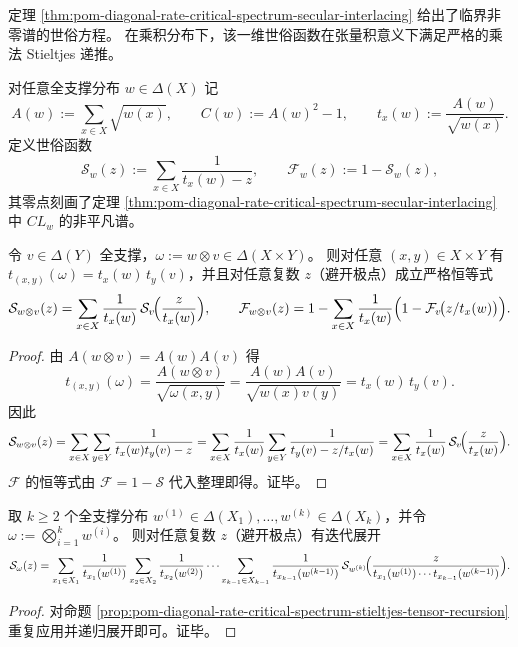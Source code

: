 定理 \ref{thm:pom-diagonal-rate-critical-spectrum-secular-interlacing} 给出了临界非零谱的世俗方程。
在乘积分布下，该一维世俗函数在张量积意义下满足严格的乘法 Stieltjes 递推。

\begin{proposition}\label{prop:pom-diagonal-rate-critical-spectrum-stieltjes-tensor-recursion}
对任意全支撑分布 \(w\in\Delta(X)\) 记
\[
A(w):=\sum_{x\in X}\sqrt{w(x)},\qquad
C(w):=A(w)^2-1,
\qquad
t_x(w):=\frac{A(w)}{\sqrt{w(x)}}.
\]
定义世俗函数
\[
\mathcal S_w(z):=\sum_{x\in X}\frac{1}{t_x(w)-z},
\qquad
\mathcal F_w(z):=1-\mathcal S_w(z),
\]
其零点刻画了定理 \ref{thm:pom-diagonal-rate-critical-spectrum-secular-interlacing} 中 \(CL_w\) 的非平凡谱。
\par
令 \(v\in\Delta(Y)\) 全支撑，\(\omega:=w\otimes v\in\Delta(X\times Y)\)。
则对任意 \((x,y)\in X\times Y\) 有
\(
t_{(x,y)}(\omega)=t_x(w)\,t_y(v)
\)，并且对任意复数 \(z\)（避开极点）成立严格恒等式
\[
\mathcal S_{w\otimes v}(z)
=\sum_{x\in X}\frac{1}{t_x(w)}\,\mathcal S_v\!\Bigl(\frac{z}{t_x(w)}\Bigr),
\qquad
\mathcal F_{w\otimes v}(z)
=1-\sum_{x\in X}\frac{1}{t_x(w)}\Bigl(1-\mathcal F_v\!\bigl(z/t_x(w)\bigr)\Bigr).
\]
\end{proposition}
\begin{proof}
由 \(A(w\otimes v)=A(w)A(v)\) 得
\[
t_{(x,y)}(\omega)
=\frac{A(w\otimes v)}{\sqrt{\omega(x,y)}}
=\frac{A(w)A(v)}{\sqrt{w(x)v(y)}}
=t_x(w)\,t_y(v).
\]
因此
\[
\mathcal S_{w\otimes v}(z)
=\sum_{x\in X}\sum_{y\in Y}\frac{1}{t_x(w)t_y(v)-z}
=\sum_{x\in X}\frac{1}{t_x(w)}\sum_{y\in Y}\frac{1}{t_y(v)-z/t_x(w)}
=\sum_{x\in X}\frac{1}{t_x(w)}\,\mathcal S_v\!\Bigl(\frac{z}{t_x(w)}\Bigr).
\]
\(\mathcal F\) 的恒等式由 \(\mathcal F=1-\mathcal S\) 代入整理即得。证毕。
\end{proof}

\begin{corollary}\label{cor:pom-diagonal-rate-critical-spectrum-stieltjes-tensor-recursion-kfold}
取 \(k\ge 2\) 个全支撑分布 \(w^{(1)}\in\Delta(X_1),\dots,w^{(k)}\in\Delta(X_k)\)，并令 \(\omega:=\bigotimes_{i=1}^k w^{(i)}\)。
则对任意复数 \(z\)（避开极点）有迭代展开
\[
\mathcal S_{\omega}(z)
=\sum_{x_1\in X_1}\frac{1}{t_{x_1}(w^{(1)})}
\sum_{x_2\in X_2}\frac{1}{t_{x_2}(w^{(2)})}\cdots
\sum_{x_{k-1}\in X_{k-1}}\frac{1}{t_{x_{k-1}}(w^{(k-1)})}\,
\mathcal S_{w^{(k)}}\!\Bigl(\frac{z}{t_{x_1}(w^{(1)})\cdots t_{x_{k-1}}(w^{(k-1)})}\Bigr).
\]
\end{corollary}
\begin{proof}
对命题 \ref{prop:pom-diagonal-rate-critical-spectrum-stieltjes-tensor-recursion} 重复应用并递归展开即可。证毕。
\end{proof}
